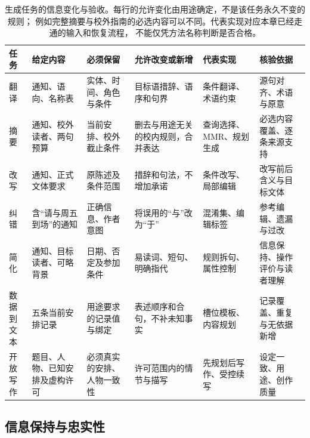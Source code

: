 \begin{table}[htbp]
  \centering
  \small
  \setlength{\tabcolsep}{3pt}
  \renewcommand{\tabularxcolumn}[1]{>{\raggedright\arraybackslash}p{#1}}
  \begin{tabularx}{\linewidth}{@{}>{\raggedright\arraybackslash}p{13mm}XXXXX@{}}
    \toprule
    任务 & 给定内容 & 必须保留 & 允许改变或新增 & 代表实现 & 核验依据\\
    \midrule
    翻译 & 通知、语向、名称表 & 实体、时间、角色与条件 & 目标语措辞、语序和句界 &
    条件翻译、术语约束 & 源句对齐、术语与原意\\
    \addlinespace
    摘要 & 通知、校外读者、两句预算 & 当前安排、校外截止条件 &
    删去与用途无关的校内规则，合并表达 & 查询选择、MMR、规划生成 &
    必选内容覆盖、逐条来源支持\\
    \addlinespace
    改写 & 通知、正式文体要求 & 原陈述及条件范围 &
    措辞和句法，不增加承诺 & 条件改写、局部编辑 &
    改写前后含义与目标文体\\
    \addlinespace
    纠错 & 含“请与周五到场”的通知 & 正确信息、作者意图 &
    将误用的“与”改为“于” & 混淆集、编辑标签 &
    参考编辑、遗漏与过改\\
    \addlinespace
    简化 & 通知、目标读者、可略背景 & 日期、否定及参加条件 &
    易读词、短句、明确指代 & 规则拆句、属性控制 &
    信息保持、操作评价与读者理解\\
    \addlinespace
    \shortstack[l]{数据到\\文本} & 五条当前安排记录 & 用途要求的记录值与绑定 &
    表述顺序和合句，不补未知事实 & 槽位模板、内容规划 &
    记录覆盖、重复与无依据新增\\
    \addlinespace
    开放写作 & 题目、人物、已知安排及虚构许可 & 必须真实的安排、人物一致性 &
    许可范围内的情节与描写 & 先规划后写作、受控续写 &
    设定一致、用途、创作质量\\
    \bottomrule
  \end{tabularx}
  \caption{生成任务的信息变化与验收。每行的允许变化由用途确定，不是该任务永久不变的规则；
  例如完整摘要与校外指南的必选内容可以不同。代表实现对应本章已经走通的输入和恢复流程，
  不能仅凭方法名称判断是否合格。}
  \label{tab:nlp-generation-contracts}
\end{table}
\FloatBarrier

\subsection{信息保持与忠实性}
\label{sec:nlp-generation-faithfulness}

